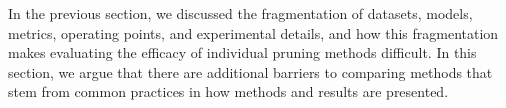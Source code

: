 




In the previous section, we discussed the fragmentation of datasets, models, metrics, operating points, and experimental details, and how this fragmentation makes evaluating the efficacy of individual pruning methods difficult. In this section, we argue that there are additional barriers to comparing methods that stem from common practices in how methods and results are presented.%


